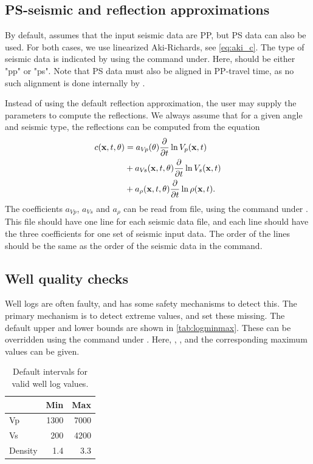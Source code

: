 \subsection{PS-seismic and reflection approximations}
By default, \crava assumes that the input seismic data are PP, but PS
data can also be used. For both cases, we use  linearized
Aki-Richards, see \autoref{eq:aki_c}. The type of seismic data is
indicated by using the  command
under. Here,  should be either "pp" or
"ps". Note that PS data must also be aligned in PP-travel time, as no
such alignment is done internally by \crava. 

Instead of using the default reflection approximation, the user may
supply the parameters to compute the reflections. We always assume
that for a given angle and seismic type, the reflections can be
computed from the equation 
\begin{equation}
\begin{split}
  c(\mathbf{x},t,\theta)
  & = a_{V\!p} (\theta) \frac{\partial}{\partial t}\ln V_p (\mathbf{x},t)\\
  & + a_{V\!s} (\mathbf{x},t,\theta) \frac{\partial}{\partial t}\ln V_s (\mathbf{x},t)\\
  & + a_\rho(\mathbf{x},t,\theta) \frac{\partial}{\partial t}\ln\rho(\mathbf{x},t).
\label{eq:linrefl}
\end{split}
\end{equation}
The coefficients $a_{V\!p}$, $a_{V\!s}$ and $a_\rho$ can be read from
file, using the 
command under . This file should have one line
for each seismic data file, and each line should have the three
coefficients for one set of seismic input data. The order of the lines
should be the same as the order of the seismic data in the 
command. 

\subsection{Well quality checks}
Well logs are often faulty, and \crava has some safety mechanisms to
detect this. The primary mechanism is to detect extreme values, and
set these missing. The default upper and lower bounds are shown in
\autoref{tab:logminmax}. These can be overridden using the command
 under
. Here, , ,
 and the corresponding maximum values can be
given. 
\begin{table}
\begin{tabular}{|lrr|}
\hline
& Min & Max \\
\hline
Vp & 1300 & 7000 \\
Vs &  200 & 4200 \\
Density & 1.4 & 3.3 \\
\hline
\end{tabular}
\caption{Default intervals for valid well log values.\label{tab:logminmax}}
\end{table}


